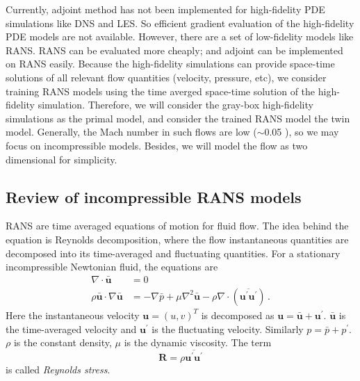 \documentclass[a4paper,onecolumn]{article}
\theoremstyle{remark}
\begin{document}
\noindent Currently, adjoint method has not been implemented for high-fidelity PDE simulations
like DNS and LES. So efficient gradient evaluation of the high-fidelity PDE models 
are not available.
However, there are a set of low-fidelity models like RANS. 
RANS can be evaluated more cheaply; and adjoint can be implemented on RANS easily.
Because the high-fidelity simulations can provide
space-time solutions of all relevant flow quantities (velocity, pressure, etc), we consider
training RANS models using the time averged space-time solution of the high-fidelity simulation.
Therefore, we will consider the gray-box high-fidelity simulations as the primal model,
and consider the trained RANS model the twin model.
Generally, the Mach number in such flows are low ($\sim$0.05 \cite{ubend rans opt 1}),
so we may focus on incompressible models. Besides, we will model the flow as two dimensional
for simplicity.
\\

\subsection{Review of incompressible RANS models}
\noindent RANS are time averaged equations of motion for fluid flow.
The idea behind the equation is Reynolds decomposition, where the flow instantaneous
quantities are decomposed into its time-averaged and fluctuating quantities.
For a stationary incompressible Newtonian fluid, the equations are
\begin{equation}\begin{split}
    \nabla\cdot \bar{\mathbf{u}} &= 0\\
    \rho \bar{\mathbf{u}}\cdot \nabla \bar{\mathbf{u}} &= -\nabla \bar{p} + \mu \nabla^2
    \bar{\mathbf{u}}
    -{\rho} \nabla \cdot\left(\overline{\mathbf{u}^\prime \mathbf{u}^\prime}\right)\,.
\end{split}\end{equation}
Here the instantaneous velocity $\mathbf{u} = (u,v)^T$ is decomposed as 
$\mathbf{u} = \bar{\mathbf{u}} + \mathbf{u}^\prime$. $\bar{\mathbf{u}}$ is the 
time-averaged velocity and $\mathbf{u}^\prime$ is the fluctuating velocity.
Similarly $p = \bar{p} + p^\prime$.
$\rho$ is the constant density, $\mu$ is the dynamic viscosity.
The term
\begin{equation}
    \mathbf{R} = \rho \overline{\mathbf{u}^\prime \mathbf{u}^\prime}
\end{equation}
is called \emph{Reynolds stress}.\\
\end{document}

